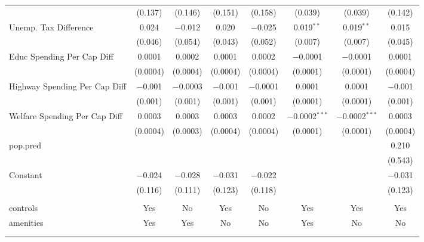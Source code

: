 \begin{table}[!htbp]
\begin{tabular}{@{\extracolsep{5pt}}lccccccc}
  & (0.137) & (0.146) & (0.151) & (0.158) & (0.039) & (0.039) & (0.142) \\ 
  Unemp. Tax Difference & 0.024 & $-$0.012 & 0.020 & $-$0.025 & 0.019$^{**}$ & 0.019$^{**}$ & 0.015 \\ 
  & (0.046) & (0.054) & (0.043) & (0.052) & (0.007) & (0.007) & (0.045) \\ 
  Educ Spending Per Cap Diff & 0.0001 & 0.0002 & 0.0001 & 0.0002 & $-$0.0001 & $-$0.0001 & 0.0001 \\ 
  & (0.0004) & (0.0004) & (0.0004) & (0.0004) & (0.0001) & (0.0001) & (0.0004) \\ 
  Highway Spending Per Cap Diff & $-$0.001 & $-$0.0003 & $-$0.001 & $-$0.0001 & 0.0001 & 0.0001 & $-$0.001 \\ 
  & (0.001) & (0.001) & (0.001) & (0.001) & (0.0001) & (0.0001) & (0.001) \\ 
  Welfare Spending Per Cap Diff & 0.0003 & 0.0003 & 0.0003 & 0.0002 & $-$0.0002$^{***}$ & $-$0.0002$^{***}$ & 0.0003 \\ 
  & (0.0004) & (0.0003) & (0.0004) & (0.0004) & (0.0001) & (0.0001) & (0.0004) \\ 
  pop.pred &  &  &  &  &  &  & 0.210 \\ 
  &  &  &  &  &  &  & (0.543) \\ 
  Constant & $-$0.024 & $-$0.028 & $-$0.031 & $-$0.022 &  &  & $-$0.031 \\ 
  & (0.116) & (0.111) & (0.123) & (0.118) &  &  & (0.123) \\ 
 \hline \\[-1.8ex] 
controls & Yes & No & Yes & No & Yes & Yes & Yes \\ 
amenities & Yes & Yes & No & No & Yes & No & No \\ 
\hline \\[-1.8ex] 
\hline 
\hline \\[-1.8ex] 
\end{tabular} 
\end{table} 
